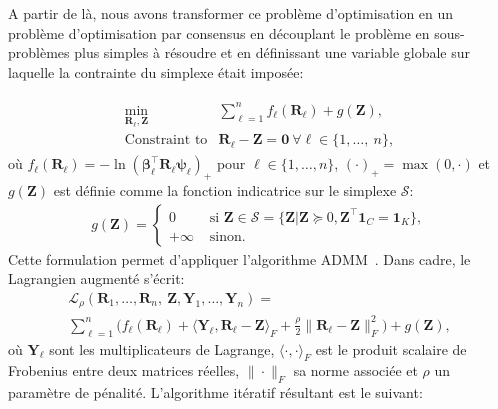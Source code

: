 A partir de là, nous avons transformer ce problème d'optimisation en un problème d'optimisation par consensus en découplant le problème en sous-problèmes plus simples à résoudre et en définissant une variable globale sur laquelle la contrainte du simplexe était imposée:

\begin{eqnarray}
  \label{eq:consensus}
   \begin{array}{rl}
     \displaystyle{\min_{\mathbf{R}_\ell,\mathbf{Z}}} & \displaystyle{\sum_{\ell = 1}^{n}f_\ell(\mathbf{R}_\ell)} + g(\mathbf{Z}),\\
     \text{Constraint to} & \mathbf{R}_\ell - \mathbf{Z} = \mathbf{0}\ \forall \ell\in\{1,\ldots,\ n\},
   \end{array}
\end{eqnarray}
où \(f_\ell(\mathbf{R}_\ell)  = -\ln(\boldsymbol{\beta}_\ell^\top\mathbf{R}_\ell\boldsymbol{\psi}_\ell)_{+}\) pour \(\ell\in \{1,\ldots,n\}\), \((\cdot)_{+}=\max(0, \cdot)\) et \(g(\mathbf{Z})\) est définie comme la fonction indicatrice sur le simplexe \(\mathcal{S}\):
\begin{eqnarray}
  g(\mathbf{Z})  =  \left\{
                      \begin{array}{rl}
                        0 & \text{ si } \mathbf{Z}\in\mathcal{S} = \{\mathbf{Z}|\mathbf{Z}\succcurlyeq 0, \mathbf{Z}^\top\mathbf{1}_C = \mathbf{1}_{K}\}, \\
                        +\infty & \text{ sinon.} 
                      \end{array}
                                  \right.                                  \label{eq:simplex}
\end{eqnarray}
Cette formulation permet d'appliquer l'algorithme ADMM~\cite[Chapter~7]{boyd-2010-distr-optim}. Dans cadre, le Lagrangien augmenté s'écrit:
\begin{multline}
  \mathcal{L}_{\rho}(\mathbf{R}_1,\ldots,\mathbf{R}_n,\ \mathbf{Z},\mathbf{Y}_1,\ldots,\mathbf{Y}_n) = \\ \sum_{\ell=1}^{n} \Bigg(f_{\ell}(\mathbf{R}_\ell) + \langle\mathbf{Y}_\ell, \mathbf{R}_\ell - \mathbf{Z}\rangle_F + \frac{\rho}{2}\|\mathbf{R}_\ell - \mathbf{Z}\|^2_F\Bigg) + g(\mathbf{Z}),
  \label{eq:consensus:lagrangian}  
\end{multline}
où \(\mathbf{Y}_\ell\) sont les multiplicateurs de Lagrange, \(\langle\cdot,\cdot\rangle_F\) est le produit scalaire de Frobenius entre deux matrices réelles, \(\|\cdot\|_F\) sa norme associée et \(\rho\) un paramètre de pénalité. L'algorithme itératif résultant est le suivant:

